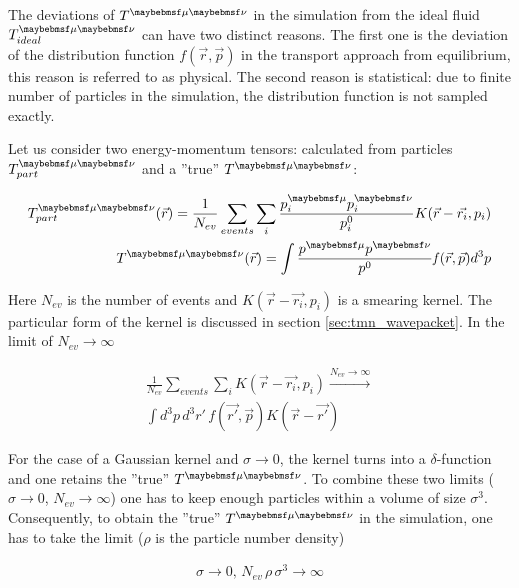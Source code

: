 The deviations of $\Tmn$ in the simulation from the ideal fluid $\Tmn_{ideal}$
can have two distinct reasons. The first one is the deviation of the
distribution function $\mathit{f}(\vec{r},\vec{p})$ in the transport approach
from equilibrium, this reason is referred to as physical. The second reason is
statistical: due to finite number of particles in the simulation, the
distribution function is not sampled exactly.

Let us consider two energy-momentum tensors: calculated from particles
$\Tmn_{part}$ and a ''true'' $\Tmn$:

\begin{align}
  \Tmn_{part}(\vec{r}) =\frac{1}{N_{ev}} \sum_{events} \sum_i \frac{p^{\mu}_i p^{\nu}_i}{p^0_i} K(\vec{r} - \vec{r_i}, p_i) \\
  \Tmn(\vec{r}) = \int \frac{p^{\mu} p^{\nu}}{p^0} \mathit{f}(\vec{r},\vec{p}) d^3p
\end{align}

Here $N_{ev}$ is the number of events and $K(\vec{r} - \vec{r_i}, p_i)$ is a
smearing kernel. The particular form of the kernel is discussed in section
\ref{sec:tmn_wavepacket}. In the limit of $N_{ev} \to \infty$

\begin{align}
  \frac{1}{N_{ev}} \sum_{events} \sum_i K(\vec{r} - \vec{r_i}, p_i) \xrightarrow{N_{ev} \to \infty} \\ \int d^3p \, d^3r' \, \mathit{f}(\vec{r'}, \vec{p}) K(\vec{r} - \vec{r'}) \nonumber
\end{align}

For the case of a Gaussian kernel and $\sigma \to 0$, the kernel turns into a
$\delta$-function and one retains the ''true'' $\Tmn$. To combine
these two limits ($\sigma \to 0$, $N_{ev} \to \infty$) one has to keep enough
particles within a volume of size $\sigma^3$. Consequently, to obtain the
''true'' $\Tmn$ in the simulation, one has to take the limit ($\rho$ is the particle
number density)

\begin{align} \label{Eq:true_Tmn_condition}
  \sigma \to 0,\, N_{ev} \, \rho \, \sigma^3 \to \infty
\end{align}

